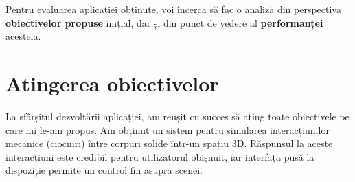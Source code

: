 \documentclass[12pt,a4paper]{report}
\newcommand{\worktype}[1]{[\textit{#1}] }
\newcommand{\dezvoltare}{\worktype{Dezvoltare de produs}}
\newcommand{\cercetare}{\worktype{Cercetare}}
\newcommand{\ambele}{\worktype{Ambele}}
\begin{document}
%
Pentru evaluarea aplicației obținute, voi încerca să fac o analiză din perspectiva \textbf{obiectivelor propuse} inițial, dar și din punct de vedere al \textbf{performanței} acesteia.

\section{Atingerea obiectivelor}

La sfârșitul dezvoltării aplicației, am reușit cu succes să ating toate obiectivele pe care mi le-am propus. Am obținut un sistem pentru simularea interacțiunilor mecanice (ciocniri) între corpuri solide într-un spațiu 3D. Răspunsul la aceste interacțiuni este credibil pentru utilizatorul obișnuit, iar interfața pusă la dispoziție permite un control fin asupra scenei.
\end{document}
